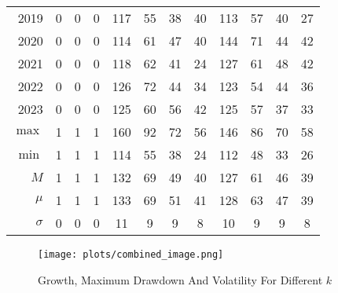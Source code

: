 \documentclass{article}
\begin{document}
\begin{table}[!ht]
\begin{tabular}{r| ccc|| cccc||cccc}
        2019 & 0 & 0 & 0 & 117 & 55 & 38 & 40 & 113 & 57 & 40 & 27 \\ 
        2020 & 0 & 0 & 0 & 114 & 61 & 47 & 40 & 144 & 71 & 44 & 42 \\ 
        2021 & 0 & 0 & 0 & 118 & 62 & 41 & 24 & 127 & 61 & 48 & 42 \\ 
        2022 & 0 & 0 & 0 & 126 & 72 & 44 & 34 & 123 & 54 & 44 & 36 \\ 
        2023 & 0 & 0 & 0 & 125 & 60 & 56 & 42 & 125 & 57 & 37 & 33 \\ \hline\hline
        $\max$ & 1 & 1 & 1 & 160 & 92 & 72 & 56 & 146 & 86 & 70 & 58 \\ 
        $\min$ & 1 & 1 & 1 & 114 & 55 & 38 & 24 & 112 & 48 & 33 & 26 \\ 
        $M$ & 1 & 1 & 1 & 132 & 69 & 49 & 40 & 127 & 61 & 46 & 39 \\ 
        $\mu$ & 1 & 1 & 1 & 133 & 69 & 51 & 41 & 128 & 63 & 47 & 39 \\ 
        $\sigma$ & 0 & 0 & 0 & 11 & 9 & 9 & 8 & 10 & 9 & 9 & 8 \\ 
\hline
\end{tabular}
\label{tab:transaction_costs}
\end{table}

\newpage
\begin{figure}[h!]
  \centering
  \texttt{[image: plots/combined\_image.png]} %
  \caption{Growth, Maximum Drawdown And Volatility For Different $k$}
  \label{fig:Growth, Maximum Drawdown And Volatility For Different $k$}
  
\end{figure}
\end{document}
